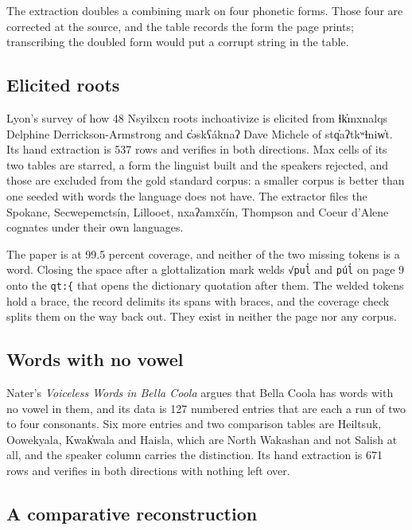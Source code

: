 The extraction doubles a combining mark on four phonetic forms. Those four are corrected at the source, and the table records the form the page prints; transcribing the doubled form would put a corrupt string in the table.

\subsection{Elicited roots}

Lyon's survey of how 48 Nsyilxcn roots inchoativize \cite{src:Lyon-2025} is elicited from ɬk̓mxnalqs Delphine Derrickson-Armstrong and c̓əskʕáknaʔ Dave Michele of stq̓aʔtkʷɬniw̓t. Its hand extraction is 537 rows and verifies in both directions. Max cells of its two tables are starred, a form the linguist built and the speakers rejected, and those are excluded from the gold standard corpus: a smaller corpus is better than one seeded with words the language does not have. The extractor files the Spokane, Secwepemctsín, Lillooet, nxaʔamxčín, Thompson and Coeur d'Alene cognates under their own languages.

The paper is at 99.5 percent coverage, and neither of the two missing tokens is a word. Closing the space after a glottalization mark welds \texttt{√pul̕} and \texttt{púl̕} on page 9 onto the \texttt{qt:\{} that opens the dictionary quotation after them. The welded tokens hold a brace, the record delimits its spans with braces, and the coverage check splits them on the way back out. They exist in neither the page nor any corpus.

\subsection{Words with no vowel}

Nater's \emph{Voiceless Words in Bella Coola} \cite{src:Nater-2024} argues that Bella Coola has words with no vowel in them, and its data is 127 numbered entries that are each a run of two to four consonants. Six more entries and two comparison tables are Heiltsuk, Oowekyala, Kwak̓wala and Haisla, which are North Wakashan and not Salish at all, and the speaker column carries the distinction. Its hand extraction is 671 rows and verifies in both directions with nothing left over.

\subsection{A comparative reconstruction}

